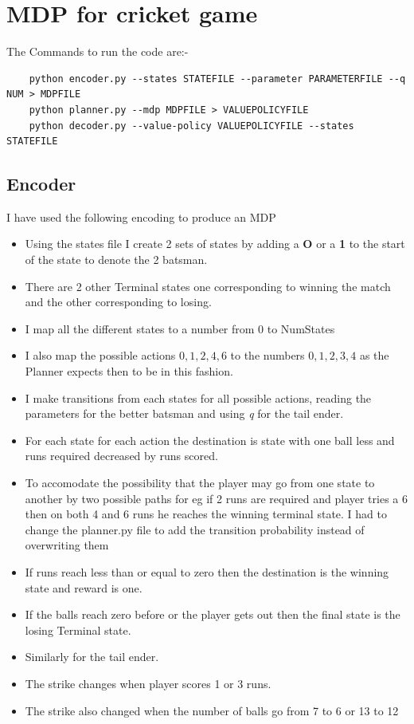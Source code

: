 \documentclass[10pt]{article}
\begin{document}
\section{MDP for cricket game}

The Commands to run the code are:-
\begin{verbatim}
    python encoder.py --states STATEFILE --parameter PARAMETERFILE --q NUM > MDPFILE
    python planner.py --mdp MDPFILE > VALUEPOLICYFILE
    python decoder.py --value-policy VALUEPOLICYFILE --states STATEFILE
\end{verbatim}

\subsection{Encoder}
I have used the following encoding to produce an MDP

\begin{itemize}
    \item Using the states file I create 2 sets of states by adding a \textbf{O} or a \textbf{1} to the start of the state to denote the 2 batsman.
    \item There are 2 other Terminal states one corresponding to winning the match and the other corresponding to losing.
    \item I map all the different states to  a number from $0$ to NumStates
    \item I also map the possible actions $0,1,2,4,6$ to the numbers $0,1,2,3,4$ as the Planner expects then to be in this fashion.
    \item I make transitions from each states for all possible actions, reading the parameters for the better batsman and using \textit{q} for the tail ender.
    \item For each state for each action the destination is state with one ball less and runs required decreased by runs scored.
    \item To accomodate the possibility that the player may go from one state to another by two possible paths for eg if 2 runs are required and player tries a 6 then on both 4 and 6 runs he reaches the winning terminal state. I had to change the planner.py file to add the transition probability instead of overwriting them
    \item If runs reach less than or equal to zero then the destination is the winning state and reward is one.
    \item If the balls reach zero before or the player gets out then the final state is the losing Terminal state.
    \item Similarly for the tail ender.
    \item The strike changes when player scores 1 or 3 runs.
    \item The strike also changed when the number of balls go from 7 to 6 or 13 to 12
\end{itemize} 
\end{document}
